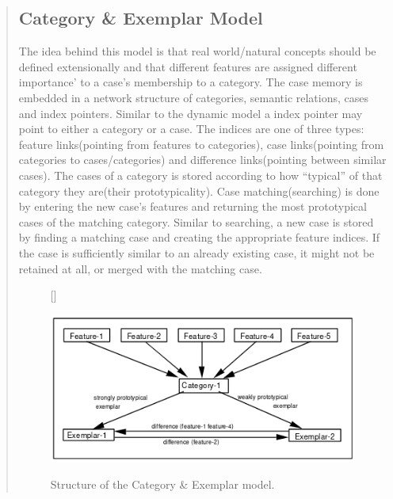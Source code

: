 \documentclass[11pt, letterpaper]{report}
\numberwithin{equation}{section}
\begin{document}
\begin{quote}
\begin{figure}
\end{figure}

\subsection{Category \& Exemplar Model} \label{subsec:cat_exem_model}
The idea behind this model is that real world/natural concepts should be defined
extensionally and that different features are assigned different importance' to
a case's membership to a category. The case memory is embedded in a network
structure of categories, semantic relations, cases and index pointers. Similar to
the dynamic model a index pointer may point to either a category or a case. The
indices are one of three types: feature links(pointing from features to
categories), case links(pointing from categories to cases/categories) and
difference links(pointing between similar cases). The cases of a category is
stored according to how ``typical'' of that category they are(their
prototypicality). Case matching(searching) is done by entering the new case's
features and returning the most prototypical cases of the matching category.
Similar to searching, a new case is stored by finding a matching case and creating
the appropriate feature indices. If the case is sufficiently similar to an
already existing case, it might not be retained at all, or merged with the
matching case.

\begin{figure}
  [\FBwidth]
  {\caption[Structure of the Category \& Exemplar model]{Structure of the
      Category \& Exemplar model.}
  \label{fig:exemplarmodel}}
  {\includegraphics{cat_exemplar_model}}

\end{figure}

\end{quote}
\end{document}

